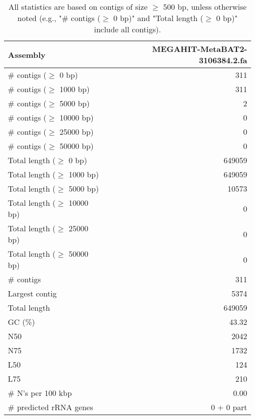 \documentclass[12pt,a4paper]{article}
\begin{document}
\begin{table}[ht]
\begin{center}
\caption{All statistics are based on contigs of size $\geq$ 500 bp, unless otherwise noted (e.g., "\# contigs ($\geq$ 0 bp)" and "Total length ($\geq$ 0 bp)" include all contigs).}
\begin{tabular}{|l*{1}{|r}|}
\hline
Assembly & MEGAHIT-MetaBAT2-3106384.2.fa \\ \hline
\# contigs ($\geq$ 0 bp) & 311 \\ \hline
\# contigs ($\geq$ 1000 bp) & 311 \\ \hline
\# contigs ($\geq$ 5000 bp) & 2 \\ \hline
\# contigs ($\geq$ 10000 bp) & 0 \\ \hline
\# contigs ($\geq$ 25000 bp) & 0 \\ \hline
\# contigs ($\geq$ 50000 bp) & 0 \\ \hline
Total length ($\geq$ 0 bp) & 649059 \\ \hline
Total length ($\geq$ 1000 bp) & 649059 \\ \hline
Total length ($\geq$ 5000 bp) & 10573 \\ \hline
Total length ($\geq$ 10000 bp) & 0 \\ \hline
Total length ($\geq$ 25000 bp) & 0 \\ \hline
Total length ($\geq$ 50000 bp) & 0 \\ \hline
\# contigs & 311 \\ \hline
Largest contig & 5374 \\ \hline
Total length & 649059 \\ \hline
GC (\%) & 43.32 \\ \hline
N50 & 2042 \\ \hline
N75 & 1732 \\ \hline
L50 & 124 \\ \hline
L75 & 210 \\ \hline
\# N's per 100 kbp & 0.00 \\ \hline
\# predicted rRNA genes & 0 + 0 part \\ \hline
\end{tabular}
\end{center}
\end{table}
\end{document}
